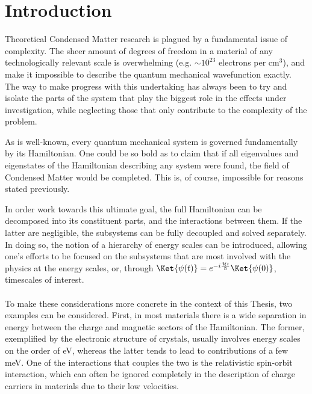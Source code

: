 \chapter{Introduction}
Theoretical Condensed Matter research is plagued by a fundamental issue of complexity. The sheer amount of degrees of freedom in a material of any technologically relevant scale is overwhelming (e.g. $\sim10^{23}$ electrons per cm$^3$), and make it impossible to describe the quantum mechanical wavefunction exactly.
The way to make progress with this undertaking has always been to try and isolate the parts of the system that play the biggest role in the effects under investigation, while neglecting those that only contribute to the complexity of the problem.

As is well-known, every quantum mechanical system is governed fundamentally by its Hamiltonian.
One could be so bold as to claim that if all eigenvalues and eigenstates of the Hamiltonian describing any system were found, the field of Condensed Matter would be completed. This is, of course, impossible for reasons stated previously.

In order work towards this ultimate goal, the full Hamiltonian can be decomposed into its constituent parts, and the interactions between them.
If the latter are negligible, the subsystems can be fully decoupled and solved separately. In doing so, the notion of a hierarchy of energy scales can be introduced, allowing one's efforts to be focused on the subsystems that are most involved with the physics at the energy scales, or, through $\Ket{\psi(t)} = e^{-i \frac{\mathcal{H}t}{\hbar}}\Ket{\psi(0)}$, timescales of interest.
\\\\
To make these considerations more concrete in the context of this Thesis, two examples can be considered.
First, in most materials there is a wide separation in energy between the charge and magnetic sectors of the Hamiltonian. The former, exemplified by the electronic structure of crystals, usually involves energy scales on the order of eV, whereas the latter tends to lead to contributions of a few meV.
One of the interactions that couples the two is the relativistic spin-orbit interaction, which can often be ignored completely in the description of charge carriers in materials due to their low velocities.

